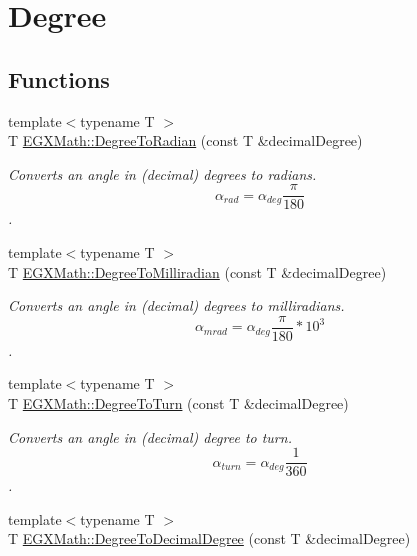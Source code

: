 \hypertarget{group___e_g_x_math-_conversions-_angle_conversions-_degree}{}\section{Degree}
\label{group___e_g_x_math-_conversions-_angle_conversions-_degree}
\subsection*{Functions}
\begin{DoxyCompactItemize}
\item 
{\footnotesize template$<$typename T $>$ }\\T \mbox{\hyperlink{group___e_g_x_math-_conversions-_angle_conversions-_degree_ga48585541b228c852c9d08a9eac3682f0}{E\+G\+X\+Math\+::\+Degree\+To\+Radian}} (const T \&decimal\+Degree)
\begin{DoxyCompactList}\small\item\em Converts an angle in (decimal) degrees to radians. \[\alpha_{rad}=\alpha_{deg}\frac{\pi}{180}\]. \end{DoxyCompactList}\item 
{\footnotesize template$<$typename T $>$ }\\T \mbox{\hyperlink{group___e_g_x_math-_conversions-_angle_conversions-_degree_gae4fa6c2d3805430760783650cfbfdb11}{E\+G\+X\+Math\+::\+Degree\+To\+Milliradian}} (const T \&decimal\+Degree)
\begin{DoxyCompactList}\small\item\em Converts an angle in (decimal) degrees to milliradians. \[\alpha_{mrad}=\alpha_{deg}\frac{\pi}{180}*10^3\]. \end{DoxyCompactList}\item 
{\footnotesize template$<$typename T $>$ }\\T \mbox{\hyperlink{group___e_g_x_math-_conversions-_angle_conversions-_degree_gafb4ce930493a7d6202ede3ee1630ef5d}{E\+G\+X\+Math\+::\+Degree\+To\+Turn}} (const T \&decimal\+Degree)
\begin{DoxyCompactList}\small\item\em Converts an angle in (decimal) degree to turn. \[\alpha_{turn}=\alpha_{deg}\frac{1}{360}\]. \end{DoxyCompactList}\item 
{\footnotesize template$<$typename T $>$ }\\T \mbox{\hyperlink{group___e_g_x_math-_conversions-_angle_conversions-_degree_ga568afc1d436d425bf5d4edea584aee08}{E\+G\+X\+Math\+::\+Degree\+To\+Decimal\+Degree}} (const T \&decimal\+Degree)

\end{DoxyCompactItemize}
